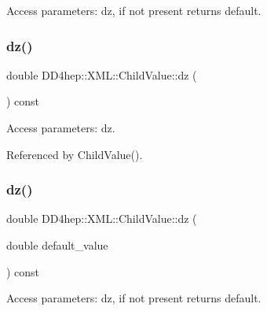 Access parameters\+: dz, if not present returns default. 

\hypertarget{struct_d_d4hep_1_1_x_m_l_1_1_child_value_a71f93a02d9809eb0f5861bee1e7288e6}{}\label{struct_d_d4hep_1_1_x_m_l_1_1_child_value_a71f93a02d9809eb0f5861bee1e7288e6} 
\subsubsection{\texorpdfstring{dz()}{dz()}\hspace{0.1cm}{\footnotesize\ttfamily [1/2]}}
{\footnotesize\ttfamily double D\+D4hep\+::\+X\+M\+L\+::\+Child\+Value\+::dz (\begin{DoxyParamCaption}{ }\end{DoxyParamCaption}) const}



Access parameters\+: dz. 



Referenced by Child\+Value().

\hypertarget{struct_d_d4hep_1_1_x_m_l_1_1_child_value_a5ea7509ecd0752970a6f1f4a5d352524}{}\label{struct_d_d4hep_1_1_x_m_l_1_1_child_value_a5ea7509ecd0752970a6f1f4a5d352524} 
\subsubsection{\texorpdfstring{dz()}{dz()}\hspace{0.1cm}{\footnotesize\ttfamily [2/2]}}
{\footnotesize\ttfamily double D\+D4hep\+::\+X\+M\+L\+::\+Child\+Value\+::dz (\begin{DoxyParamCaption}\item[{double}]{default\+\_\+value }\end{DoxyParamCaption}) const}



Access parameters\+: dz, if not present returns default. 

\hypertarget{struct_d_d4hep_1_1_x_m_l_1_1_child_value_a379e1cfe1346ba776f224280671f60ce}{}\label{struct_d_d4hep_1_1_x_m_l_1_1_child_value_a379e1cfe1346ba776f224280671f60ce} 
